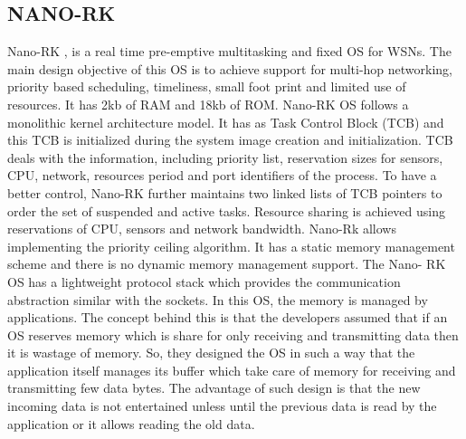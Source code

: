 \documentclass[12pt,journal,communications surveys and tutorials]{IEEEtran}
\begin{document}
\subsection{NANO-RK}
Nano-RK \cite{1563113}, is a real time pre-emptive multitasking and fixed OS for WSNs. The main design objective of this OS is to achieve support for multi-hop networking, priority based scheduling, timeliness, small foot print and limited use of resources. It has 2kb of RAM and 18kb of ROM. Nano-RK OS follows a monolithic kernel architecture model. It has as Task Control Block (TCB) and this TCB is initialized during the system image creation and initialization. TCB deals with the information, including priority list, reservation sizes for sensors, CPU, network, resources period and port identifiers of the process. To have a better control, Nano-RK further maintains two linked lists of TCB pointers to order the set of suspended and active tasks. Resource sharing is achieved using reservations of CPU, sensors and network bandwidth. Nano-Rk allows implementing the priority ceiling algorithm. It has a static memory management scheme and there is no dynamic memory management support. The Nano- RK OS has a lightweight protocol stack which provides the communication abstraction similar with the sockets. In this OS, the memory is managed by applications. The concept behind this is that the developers assumed that if an OS reserves memory which is share for only receiving and transmitting data then it is wastage of memory. So, they designed the OS in such a way that the application itself manages its buffer which take care of memory for receiving and transmitting few data bytes. The advantage of such design is that the new incoming data is not entertained unless until the previous data is read by the application or it allows reading the old data.
\end{document}
